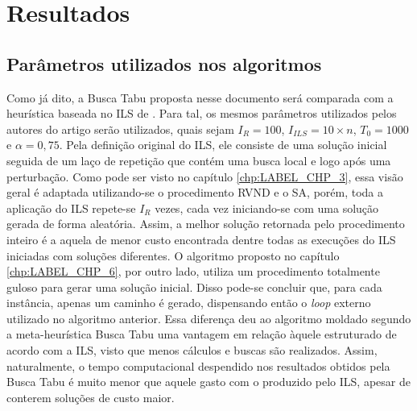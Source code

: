 \chapter{Resultados}\label{chp:LABEL_CHP_7}

\section{Parâmetros utilizados nos algoritmos}\label{sec:LABEL_CHP_7_SEC_A}

\par Como já dito, a Busca Tabu proposta nesse documento será comparada com a heurística baseada no ILS de \citep{art:REF_ART_1}. Para tal, os mesmos parâmetros utilizados pelos autores do artigo serão utilizados, quais sejam $I_R = 100$, $I_{ILS} = 10 \times n$, $T_0 = 1000$ e $\alpha = 0,75$. Pela definição original do ILS, ele consiste de uma solução inicial seguida de um laço de repetição que contém uma busca local e logo após uma perturbação. Como pode ser visto no capítulo \ref{chp:LABEL_CHP_3}, essa visão geral é adaptada utilizando-se o procedimento RVND e o SA, porém, toda a aplicação do ILS repete-se $I_R$ vezes, cada vez iniciando-se com uma solução gerada de forma aleatória. Assim, a melhor solução retornada pelo procedimento inteiro é a aquela de menor custo encontrada dentre todas as execuções do ILS iniciadas com soluções diferentes. O algoritmo proposto no capítulo \ref{chp:LABEL_CHP_6}, por outro lado, utiliza um procedimento totalmente guloso para gerar uma solução inicial. Disso pode-se concluir que, para cada instância, apenas um caminho é gerado, dispensando então o \textit{loop} externo utilizado no algoritmo anterior. Essa diferença deu ao algoritmo moldado segundo a meta-heurística Busca Tabu uma vantagem em relação àquele estruturado de acordo com a ILS, visto que menos cálculos e buscas são realizados. Assim, naturalmente, o tempo computacional despendido nos resultados obtidos pela Busca Tabu é muito menor que aquele gasto com o produzido pelo ILS, apesar de conterem soluções de custo maior. 

